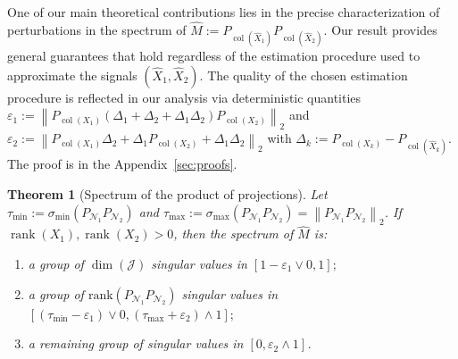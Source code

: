 \documentclass{amsart}
\DeclareMathOperator*{\col}{col}
\DeclareMathOperator*{\rank}{rank}
\newcommand{\Ncal}{\mathcal{N}}
\newtheorem{theorem}{Theorem}[section]
\begin{document}
One of our main theoretical contributions lies in the precise characterization of perturbations in the spectrum of $\widehat{M} := P_{\col (\widehat{X}_1)} P_{\col (\widehat{X}_2)}$. Our result provides general guarantees that hold regardless of the estimation procedure used to approximate the signals $(\widehat{X}_1,\widehat{X}_2)$. The quality of the chosen estimation procedure is reflected in our analysis via deterministic quantities $\varepsilon_1 := \left\|P_{{\col (X_1)}}\left(\Delta_1+\Delta_2+\Delta_1\Delta_2\right)P_{{\col (X_2)}}\right\|_2$ and $\varepsilon_2 := \left\|P_{{\col (X_1)}}\Delta_2 + \Delta_1P_{{\col (X_2)}}+\Delta_1\Delta_2\right\|_2$ with $\Delta_k := P_{{\col (X_k)}} - P_{\col (\widehat{X}_k)}$. The proof is in the Appendix~\ref{sec:proofs}.

\begin{theorem}[Spectrum of the product of projections] 
\label{theorem:main}
Let $\tau_{\min} := \sigma_{\min}(P_{\Ncal_1} P_{\Ncal_2})$ and $\tau_{\max} := \sigma_{\max}(P_{\Ncal_1} P_{\Ncal_2}) = \left\|P_{\Ncal_1} P_{\Ncal_2}\right\|_2$. If $\rank(X_1), \rank(X_2) > 0$, then the spectrum of $\widehat{M}$ is:
    \begin{enumerate}
        \item a group of $\dim(\mathcal{J})$ singular values in $\left[1 - \varepsilon_1 \vee 0, 1\right];$
        \item a group of $\mathrm{rank}\left(P_{\Ncal_1} P_{\Ncal_2} \right)$  singular values in $\left[\left(\tau_{\min} - \varepsilon_1\right) \vee 0, \left(\tau_{\max} +\varepsilon_2 \right)\wedge 1\right];$
        \item a remaining group of singular values in $[0, \varepsilon_2 \wedge 1]$.
    \end{enumerate}
 \noindent
\end{theorem}
\end{document}
